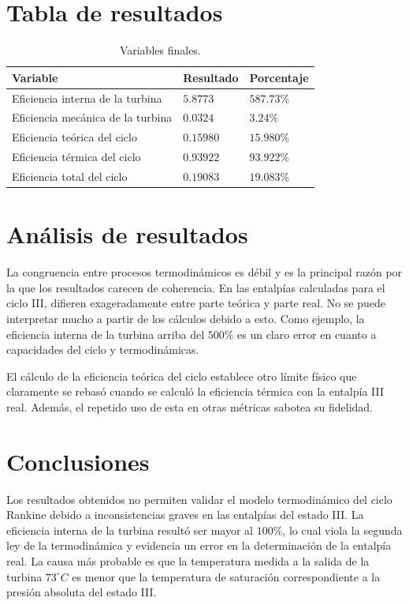 \documentclass[12pt,letterpaper]{article}
\begin{document}
\section{Tabla de resultados}

\begin{table}[H]
\centering
\renewcommand{\arraystretch}{1.4}
    \begin{tabular}{|l|l|l|}
    \hline
    \textbf{Variable} & \textbf{Resultado} & \textbf{Porcentaje} \\
    \hline
    Eficiencia interna de la turbina    & $5.8773$  & $587.73\%$ \\
    \hline
    Eficiencia mecánica de la turbina   & $0.0324$  & $3.24\%$ \\
    \hline
    Eficiencia teórica del ciclo        & $0.15980$  & $15.980\%$ \\
    \hline
    Eficiencia térmica del ciclo        & $0.93922$  & $93.922\%$ \\
    \hline
    Eficiencia total del ciclo        & $0.19083$  & $19.083\%$ \\
    \hline
    \end{tabular}
\caption{Variables finales.}
\end{table}

\section{Análisis de resultados}

La congruencia entre procesos termodinámicos es débil y es la principal razón por la que
los resultados carecen de coherencia. En las entalpías calculadas para el ciclo III, difieren 
exageradamente entre parte teórica y parte real. No se puede interpretar mucho a partir de los cálculos
debido a esto. Como ejemplo, la eficiencia interna de la turbina arriba del $500\%$ es
un claro error en cuanto a capacidades del ciclo y termodinámicas. \linebreak

El cálculo de la eficiencia teórica del ciclo establece otro límite físico que claramente se rebasó
cuando se calculó la eficiencia térmica con la entalpía III real. Además, el repetido uso de esta 
en otras métricas sabotea su fidelidad.

\section{Conclusiones}

Los resultados obtenidos no permiten validar el modelo termodinámico del ciclo Rankine
debido a inconsistencias graves en las entalpías del estado III. La eficiencia interna de la
turbina resultó ser mayor al $100\%$, lo cual viola la segunda ley de la termodinámica y evidencia
un error en la determinación de la entalpía real. La causa más probable es que la temperatura
medida a la salida de la turbina $73^\circ C$ es menor que la temperatura de saturación
correspondiente a la presión absoluta del estado III.\linebreak
\end{document}
